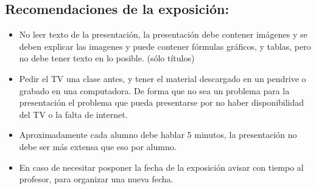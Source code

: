 \documentclass[../mainnull]{subfiles}
\begin{document}
\subsection{Recomendaciones de la exposición:}
\begin{itemize}
\item No leer texto de la presentación, la presentación debe contener imágenes y se deben explicar las imagenes y puede contener fórmulas gráficos, y tablas, pero no debe tener texto en lo posible. (sólo títulos)
\item Pedir el TV una clase antes, y tener el material descargado en un pendrive o grabado en una computadora. De forma que no sea un problema para la presentación el problema que pueda presentarse por no haber disponibilidad del TV o la falta de internet.
\item Aproximadamente cada alumno debe hablar 5 minutos, la presentación no debe ser más extensa que eso por alumno.
\item En caso de necesitar posponer la fecha de la exposición avisar con tiempo al profesor, para organizar una nueva fecha.
 
\end{itemize}
\end{document}
